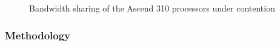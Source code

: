 \begin{figure}[tbp]
    \caption{Bandwidth sharing of the Ascend 310 processors under contention}
    \label{fig:bw_sharing}
    \end{figure}

\subsubsection{Methodology}

